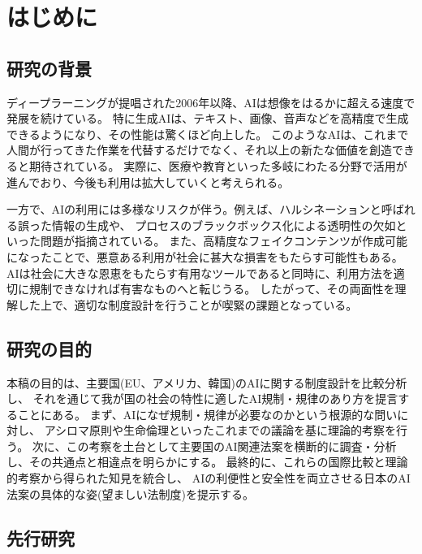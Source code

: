 \chapter{はじめに}

\section{研究の背景}
ディープラーニングが提唱された2006年以降、AIは想像をはるかに超える速度で発展を続けている。
特に生成AIは、テキスト、画像、音声などを高精度で生成できるようになり、その性能は驚くほど向上した。
このようなAIは、これまで人間が行ってきた作業を代替するだけでなく、それ以上の新たな価値を創造できると期待されている。
実際に、医療や教育といった多岐にわたる分野で活用が進んでおり、今後も利用は拡大していくと考えられる。

一方で、AIの利用には多様なリスクが伴う。例えば、ハルシネーションと呼ばれる誤った情報の生成や、
プロセスのブラックボックス化による透明性の欠如といった問題が指摘されている。
また、高精度なフェイクコンテンツが作成可能になったことで、悪意ある利用が社会に甚大な損害をもたらす可能性もある。
AIは社会に大きな恩恵をもたらす有用なツールであると同時に、利用方法を適切に規制できなければ有害なものへと転じうる。
したがって、その両面性を理解した上で、適切な制度設計を行うことが喫緊の課題となっている。


\section{研究の目的}
本稿の目的は、主要国(EU、アメリカ、韓国)のAIに関する制度設計を比較分析し、
それを通じて我が国の社会の特性に適したAI規制・規律のあり方を提言することにある。
まず、AIになぜ規制・規律が必要なのかという根源的な問いに対し、
アシロマ原則や生命倫理といったこれまでの議論を基に理論的考察を行う。
次に、この考察を土台として主要国のAI関連法案を横断的に調査・分析し、その共通点と相違点を明らかにする。
最終的に、これらの国際比較と理論的考察から得られた知見を統合し、
AIの利便性と安全性を両立させる日本のAI法案の具体的な姿(望ましい法制度)を提示する。

\section{先行研究}


